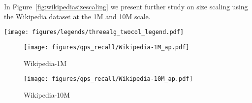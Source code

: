 In Figure~\ref{fig:wikipediasizescaling} we present further study on size scaling using the Wikipedia dataset at the 1M and 10M scale.

\begin{figure*}
	\centering
	\texttt{[image: figures/legends/threealg\_twocol\_legend.pdf]} \\
	\begin{subfigure}{.33\textwidth}
		\texttt{[image: figures/qps\_recall/Wikipedia-1M\_ap.pdf]}
		\caption{Wikipedia-1M}\label{fig:wikipedia1MAP}
	\end{subfigure} 
	\begin{subfigure}{.33\textwidth}
		\texttt{[image: figures/qps\_recall/Wikipedia-10M\_ap.pdf]}
		\caption{Wikipedia-10M}\label{fig:wikipedia10Map}
	\end{subfigure}
	\caption{Average precision vs QPS for Wikipedia-1M and 10M, from left to right.}
	\label{fig:wikipediasizescaling}
\end{figure*}





